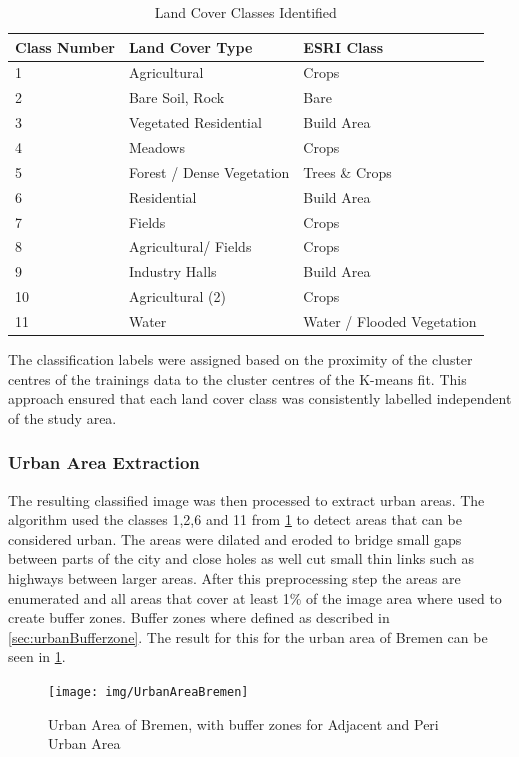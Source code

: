 \documentclass[12pt,a4paper, english,twoside]{article}
\begin{document}
      \begin{table}[ht]
      \centering
      \renewcommand{\arraystretch}{1.4}
      \caption{Land Cover Classes Identified}\label{tab:land_cover_classes}
      \begin{tabular}{p{1cm}p{4cm}l}
      \toprule
      \textbf{Class Number} & \textbf{Land Cover Type} & \textbf{ESRI Class}\\
      \midrule
      1 &  Agricultural & Crops\\
      2 &  Bare Soil, Rock & Bare \\
      3 &  Vegetated Residential & Build Area\\
      4 &  Meadows & Crops\\
      5 &  Forest / Dense Vegetation & Trees \& Crops \\
      6 &  Residential & Build Area\\
      7 &  Fields & Crops\\
      8 &  Agricultural/ Fields & Crops\\
      9 &  Industry Halls & Build Area\\
      10 &  Agricultural (2) & Crops\\
      11 &  Water& Water / Flooded Vegetation\\
      \bottomrule
      \end{tabular}
      \end{table}

      The classification labels were assigned based on the proximity of the cluster centres of the trainings data to the cluster centres of the K-means fit.
      This approach ensured that each land cover class was consistently labelled independent of the study area.\\
    \subsubsection{Urban Area Extraction}
      The resulting classified image was then processed to extract urban areas.
      The algorithm used the classes 1,2,6 and 11 from \cref{tab:land_cover_classes} to detect areas that can be considered urban.
      The areas were \gls{dilated} and \gls{eroded} to bridge small gaps between parts of the city and close holes as well cut small thin links such as highways between larger areas.
      After this preprocessing step the areas are enumerated and all areas that cover at least 1\% of the image area where used to create buffer zones. 
      Buffer zones where defined as described in \cref{sec:urbanBufferzone}. 
      The result for this for the urban area of Bremen can be seen in \cref{fig:bufferedBremen}.\\
      \begin{figure}
        \texttt{[image: img/UrbanAreaBremen]}
        \caption{Urban Area of Bremen, with buffer zones for Adjacent and Peri Urban Area\label{fig:bufferedBremen}}
      \end{figure}
\end{document}
